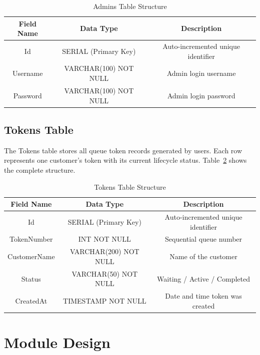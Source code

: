 \begin{table}[htbp]
    \centering
    \begin{tabular}{|c|c|c|}
        \hline
        \textbf{Field Name} & \textbf{Data Type} & \textbf{Description} \\
        \hline
        Id & SERIAL (Primary Key) & Auto-incremented unique identifier \\
        \hline
        Username & VARCHAR(100) NOT NULL & Admin login username \\
        \hline
        Password & VARCHAR(100) NOT NULL & Admin login password \\
        \hline
    \end{tabular}
    \caption{Admins Table Structure}
    \label{tab:admins}
\end{table}

\subsection{Tokens Table}

The Tokens table stores all queue token records generated by users. Each row represents one customer's token with its current lifecycle status. Table~\ref{tab:tokens} shows the complete structure.

\begin{table}[htbp]
    \centering
    \begin{tabular}{|c|c|c|}
        \hline
        \textbf{Field Name} & \textbf{Data Type} & \textbf{Description} \\
        \hline
        Id & SERIAL (Primary Key) & Auto-incremented unique identifier \\
        \hline
        TokenNumber & INT NOT NULL & Sequential queue number \\
        \hline
        CustomerName & VARCHAR(200) NOT NULL & Name of the customer \\
        \hline
        Status & VARCHAR(50) NOT NULL & Waiting / Active / Completed \\
        \hline
        CreatedAt & TIMESTAMP NOT NULL & Date and time token was created \\
        \hline
    \end{tabular}
    \caption{Tokens Table Structure}
    \label{tab:tokens}
\end{table}

\section{Module Design}

